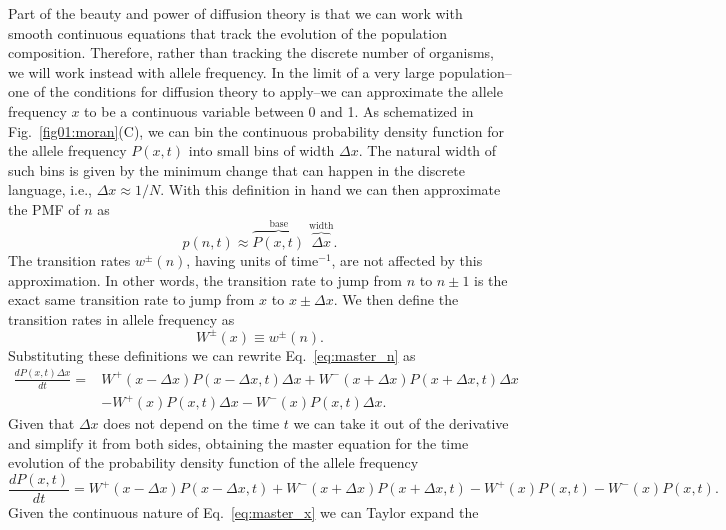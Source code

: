 Part of the beauty and power of diffusion theory is that we can work with smooth
continuous equations that track the evolution of the population composition.
Therefore, rather than tracking the discrete number of organisms, we will work
instead with allele frequency. In the limit of a very large population--one of
the conditions for diffusion theory to apply--we can approximate the allele
frequency $x$ to be a continuous variable between 0 and 1. As schematized in
Fig.~\ref{fig01:moran}(C), we can bin the continuous probability density
function for the allele frequency $P(x, t)$ into small bins of width $\Delta x$.
The natural width of such bins is given by the minimum change that can happen in
the discrete language, i.e., $\Delta x \approx 1 / N$. With this definition in
hand we can then approximate the PMF of $n$ as
\begin{equation}
  p(n, t) \approx
  \overbrace{P(x, t)}^{\text{base}} \;
  \overbrace{\Delta x}^{\text{width}}.
\end{equation}
The transition rates $w^\pm(n)$, having units of time$^{-1}$, are not affected
by this approximation. In other words, the transition rate to jump from $n$ to
$n \pm 1$ is the exact same transition rate to jump from $x$ to $x \pm \Delta
x$. We then define the transition rates in allele frequency as
\begin{equation}
  W^\pm(x) \equiv w^\pm(n).
\end{equation}
Substituting these definitions we can rewrite Eq.~\ref{eq:master_n} as
\begin{equation}
\begin{split}
    \frac{dP(x, t) \Delta x}{dt} = 
    &W^+(x - \Delta x) P(x - \Delta x, t) \Delta x
    + W^-(x + \Delta x) P(x + \Delta x, t) \Delta x\\
    &- W^+(x) P(x, t) \Delta x
    - W^-(x) P(x, t) \Delta x.
\end{split}
\end{equation}
Given that $\Delta x$ does not depend on the time $t$ we can take it out of the
derivative and simplify it from both sides, obtaining the master equation for
the time evolution of the probability density function of the allele frequency
\begin{equation}
    \frac{dP(x, t)}{dt} = 
    W^+(x - \Delta x) P(x - \Delta x, t)
    + W^-(x + \Delta x) P(x + \Delta x, t)
    - W^+(x) P(x, t) 
    - W^-(x) P(x, t).
    \label{eq:master_x} 
\end{equation}
Given the continuous nature of Eq.~\ref{eq:master_x} we can Taylor expand the
